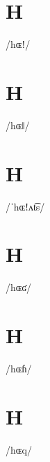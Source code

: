 \documentclass[10pt,a4paper,twoside]{book}
\begin{document}
\section*{H}

\begin{multicols}{3}
 {/hɶǃ/} {}
\end{multicols}

\section*{H}

\begin{multicols}{3}
 {/hɶǁ/} {}
\end{multicols}

\section*{H}

\begin{multicols}{3}
 {/ˈhɶǃʌt͡s/} {}
\end{multicols}

\section*{H}

\begin{multicols}{3}
 {/hɶʛ/} {}
\end{multicols}

\section*{H}

\begin{multicols}{3}
 {/hɶɦ/} {}
\end{multicols}

\section*{H}

\begin{multicols}{3}
 {/hɶq/} {}
\end{multicols}
\end{document}
